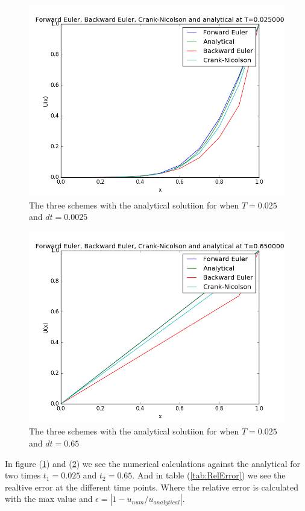 \documentclass[a4paper,10pt]{article}
\begin{document}
\begin{figure}
  \includegraphics[scale=0.5]{alldt025analyticalt1}
    \caption{The three schemes with the analytical solutiion for when $T = 0.025$ and $dt = 0.0025$}
    \label{fig:NumAna0025}
\end{figure}

\begin{figure}
  \includegraphics[scale=0.5]{alldt025analyticalt2}
    \caption{The three schemes with the analytical solutiion for when $T = 0.025$ and $dt = 0.65$}
    \label{fig:NumAna065}
\end{figure}

In figure (\ref{fig:NumAna0025}) and (\ref{fig:NumAna065}) we see the numerical calculations against the analytical for two times $t_1 = 0.025$
and $t_2 = 0.65$. And in table (\ref{tab:RelError}) we see the realtive error at the different time points. Where the relative error is
calculated with the max value and $\epsilon = |1-u_{num}/u_{anałytical}|$.
\end{document}
